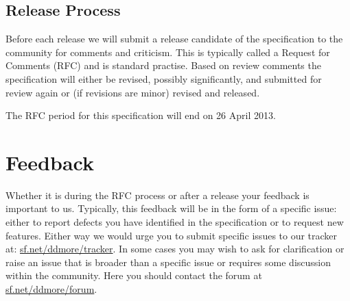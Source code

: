 \subsection{Release Process}

Before each release we will submit a release candidate of the specification to the community for comments
and criticism. This is typically called a Request for Comments (RFC) and is standard practise. Based on
review comments the specification will either be revised, possibly significantly, and submitted for review
again or (if revisions are minor) revised and released.

The RFC period for this specification will end on 26 April 2013.

\section{Feedback}

Whether it is during the RFC process or after a release your feedback is important to us. Typically,
this feedback will be in the form of a specific issue: either to report defects you have identified in
the specification or to request new features. Either way we would urge you to submit specific issues to
our tracker at: \url{sf.net/ddmore/tracker}. In some cases you may wish to ask for clarification or raise
an issue that is broader than a specific issue or requires some discussion within the community. Here you
should contact the \pharmml forum at \url{sf.net/ddmore/forum}.
